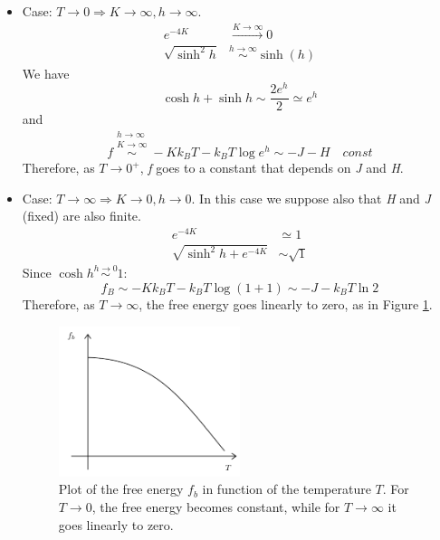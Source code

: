 \documentclass[../main/main.tex]{subfiles}
\begin{document}
\begin{itemize}
\item Case: \( T \rightarrow 0  \Rightarrow K \rightarrow \infty , h \rightarrow \infty  \).
\begin{subequations}
\begin{align*}
  e^{-4K} & \overset{K \rightarrow \infty }{\longrightarrow} 0  \\
  \sqrt{\sinh^2 h} & \overset{h \rightarrow \infty }{\sim } \sinh (h)
\end{align*}
\end{subequations}
We have 
\begin{equation*}
\cosh h + \sinh h \sim \frac{2 e^{h} }{2} \simeq e^{h}
\end{equation*}
and
\begin{equation}
  f \overset{\substack{h \rightarrow \infty  \\ K \rightarrow \infty  } }{\sim } - K k_B T - k_B T \log{e^{h} } \sim -J -H \quad const
\end{equation}
Therefore, as \( T \rightarrow 0^+ \), \emph{f} goes to a constant that depends on \emph{J} and \emph{H}.

\item  Case: \( T \rightarrow \infty   \Rightarrow K \rightarrow 0 , h \rightarrow 0  \).
In this case we suppose also that \emph{H} and \emph{J} (fixed) are also finite.
\begin{subequations}
\begin{align*}
  e^{-4K} & \simeq 1  \\
  \sqrt{\sinh^2 h + e^{-4K} } & \sim \sqrt{1}
\end{align*}
\end{subequations}
Since \( \cosh h \overset{h \rightarrow 0}{\sim } 1  \):
\begin{equation}
  f_B \sim  -K k_B T - k_B T \log{(1+1)} \sim  -J -k_B T \ln{2}
\end{equation}
Therefore, as \( T \rightarrow \infty  \), the free energy goes linearly to zero, as in Figure \ref{fig:8_1}.
\begin{figure}[h!]
\centering
\includegraphics[width=0.5\textwidth]{../lessons/8_image/1.pdf}
\caption{\label{fig:8_1} Plot of the free energy \( f_b \) in function of the temperature \( T \). For \( T \rightarrow 0 \), the free energy becomes constant, while for \( T \rightarrow \infty  \) it goes linearly to zero.  }
\end{figure}
\end{itemize}
\end{document}
